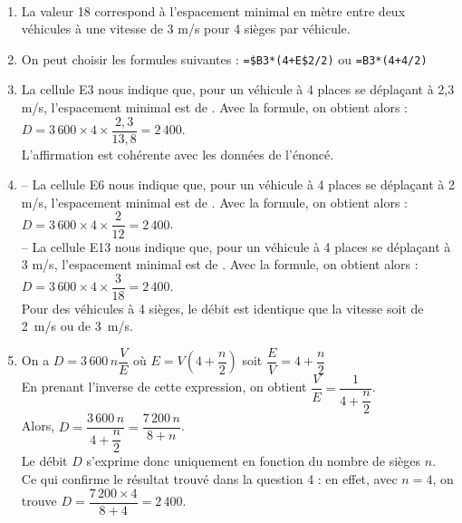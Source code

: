 \begin{corrige}
\ \\ [-5mm]
   \begin{enumerate}
      \item La valeur 18 correspond à {\blue l'espacement minimal en mètre entre deux véhicules à une vitesse de 3 m/s pour 4 sièges par véhicule}.
      \item On peut choisir les formules suivantes : {\blue\texttt{=\$B3*(4+E\$2/2)}} ou {\blue\texttt{=B3*(4+4/2)}}
      \item La cellule E3 nous indique que, pour un véhicule à 4 places se déplaçant à 2,3 m/s, l'espacement minimal est de . Avec la formule, on obtient alors : $D =3\,600\times4\times\dfrac{2,3}{13,8} =2\,400$. \\ [1mm]
         {\blue L'affirmation est cohérente avec les données de l'énoncé}.
      \item -- La cellule E6 nous indique que, pour un véhicule à 4 places se déplaçant à 2 m/s, l'espacement minimal est de . Avec la formule, on obtient alors : $D =3\,600\times4\times\dfrac{2}{12} =2\,400$. \\ [1mm]
         -- La cellule E13 nous indique que, pour un véhicule à 4 places se déplaçant à 3 m/s, l'espacement minimal est de . Avec la formule, on obtient alors : $D =3\,600\times4\times\dfrac{3}{18} =2\,400$. \\ [1mm]
         {\blue Pour des véhicules à 4 sièges, le débit est identique que la vitesse soit de 2~m/s ou de 3~m/s}. \smallskip
      \item On a $D =3\,600\,n\dfrac{V}{E}$ où $E =V\left(4+\dfrac{n}{2}\right)$ soit $\dfrac{E}{V} =4+\dfrac{n}{2}$ \\ [1mm]
         En prenant l'inverse de cette expression, on obtient $\dfrac{V}{E} =\dfrac{1}{4+\dfrac{n}{2}}$. \\ [1mm]
         Alors, $D =\dfrac{3\,600\,n}{4+\dfrac{n}{2}} =\dfrac{7\,200\,n}{8+n}$. \\ [1mm]
         {\blue Le débit $D$ s'exprime donc uniquement en fonction du nombre de sièges $n$}. \\
         Ce qui confirme le résultat trouvé dans la question 4 : en effet, avec $n=4$, on trouve $D =\dfrac{7\,200\times4}{8+4} =2\,400$.
   \end{enumerate}
\end{corrige}

\bigskip


